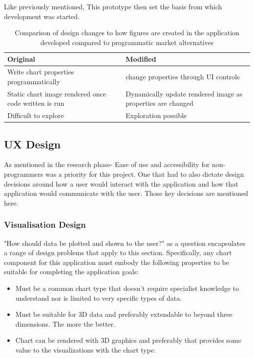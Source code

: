 Like previously mentioned, This prototype then set the basis from which development was started.

\begin{table}[t]
    \begin{tabular}{ | l | l | }
        \hline
        Original                                             & Modified                                                    \\
        \hline
        Write chart properties programmatically              & change properties through UI controls                       \\
        \hline
        Static chart image rendered once code written is run & Dynamically update rendered image as properties are changed \\
        \hline
        Difficult to explore                                 & Exploration possible                                        \\
        \hline
    \end{tabular}
    \caption{Comparison of design changes to how figures are created in the application developed compared to programmatic market alternatives}
    \label{}
\end{table}

\subsection{UX Design} \label{uxdesign}

As mentioned in the research phase- Ease of use and accessibility for non-programmers was a priority for this project. One that had to also dictate design decisions around how a user would interact with the application and how that application would communicate with the user. Those key decisions are mentioned here.

\subsubsection{Visualisation Design}
"How should data be plotted and shown to the user?" as a question encapsulates a range of design problems that apply to this section. Specifically, any chart component for this application must embody the following properties to be suitable for completing the application goals:
\begin{itemize}
    \item Must be a common chart type that doesn't require specialist knowledge to understand nor is limited to very specific types of data.
    \item Must be suitable for 3D data and preferably extendable to beyond three dimensions. The more the better.
    \item Chart can be rendered with 3D graphics and preferably that provides some value to the visualizations with the chart type.
\end{itemize}

